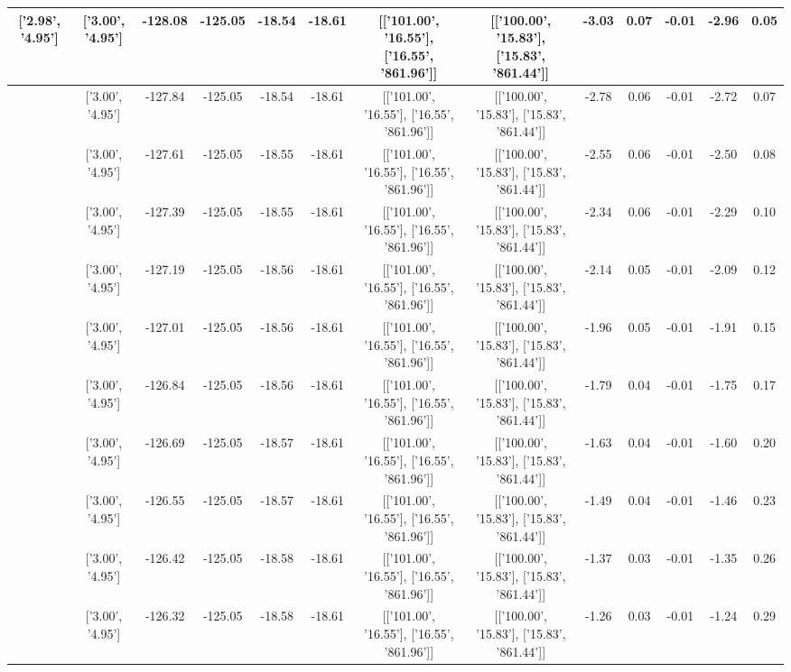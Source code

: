 \begin{table}[htbp]
\begin{adjustbox}{angle=90}
\begin{tabular}{|c|c|c|c|c|c|c|c|c|c|c|c|c|}
 ['2.98', '4.95'] & ['3.00', '4.95'] & -128.08 & -125.05 & -18.54 & -18.61 & [['101.00', '16.55'], ['16.55', '861.96']] & [['100.00', '15.83'], ['15.83', '861.44']] & -3.03 & 0.07 & -0.01 & -2.96 & 0.05\\ \hline
 ['2.98', '4.95'] & ['3.00', '4.95'] & -127.84 & -125.05 & -18.54 & -18.61 & [['101.00', '16.55'], ['16.55', '861.96']] & [['100.00', '15.83'], ['15.83', '861.44']] & -2.78 & 0.06 & -0.01 & -2.72 & 0.07\\ \hline
 ['2.98', '4.95'] & ['3.00', '4.95'] & -127.61 & -125.05 & -18.55 & -18.61 & [['101.00', '16.55'], ['16.55', '861.96']] & [['100.00', '15.83'], ['15.83', '861.44']] & -2.55 & 0.06 & -0.01 & -2.50 & 0.08\\ \hline
 ['2.98', '4.95'] & ['3.00', '4.95'] & -127.39 & -125.05 & -18.55 & -18.61 & [['101.00', '16.55'], ['16.55', '861.96']] & [['100.00', '15.83'], ['15.83', '861.44']] & -2.34 & 0.06 & -0.01 & -2.29 & 0.10\\ \hline
 ['2.98', '4.95'] & ['3.00', '4.95'] & -127.19 & -125.05 & -18.56 & -18.61 & [['101.00', '16.55'], ['16.55', '861.96']] & [['100.00', '15.83'], ['15.83', '861.44']] & -2.14 & 0.05 & -0.01 & -2.09 & 0.12\\ \hline
 ['2.99', '4.95'] & ['3.00', '4.95'] & -127.01 & -125.05 & -18.56 & -18.61 & [['101.00', '16.55'], ['16.55', '861.96']] & [['100.00', '15.83'], ['15.83', '861.44']] & -1.96 & 0.05 & -0.01 & -1.91 & 0.15\\ \hline
 ['2.99', '4.95'] & ['3.00', '4.95'] & -126.84 & -125.05 & -18.56 & -18.61 & [['101.00', '16.55'], ['16.55', '861.96']] & [['100.00', '15.83'], ['15.83', '861.44']] & -1.79 & 0.04 & -0.01 & -1.75 & 0.17\\ \hline
 ['2.99', '4.95'] & ['3.00', '4.95'] & -126.69 & -125.05 & -18.57 & -18.61 & [['101.00', '16.55'], ['16.55', '861.96']] & [['100.00', '15.83'], ['15.83', '861.44']] & -1.63 & 0.04 & -0.01 & -1.60 & 0.20\\ \hline
 ['2.99', '4.95'] & ['3.00', '4.95'] & -126.55 & -125.05 & -18.57 & -18.61 & [['101.00', '16.55'], ['16.55', '861.96']] & [['100.00', '15.83'], ['15.83', '861.44']] & -1.49 & 0.04 & -0.01 & -1.46 & 0.23\\ \hline
 ['2.99', '4.95'] & ['3.00', '4.95'] & -126.42 & -125.05 & -18.58 & -18.61 & [['101.00', '16.55'], ['16.55', '861.96']] & [['100.00', '15.83'], ['15.83', '861.44']] & -1.37 & 0.03 & -0.01 & -1.35 & 0.26\\ \hline
 ['2.99', '4.95'] & ['3.00', '4.95'] & -126.32 & -125.05 & -18.58 & -18.61 & [['101.00', '16.55'], ['16.55', '861.96']] & [['100.00', '15.83'], ['15.83', '861.44']] & -1.26 & 0.03 & -0.01 & -1.24 & 0.29\\ \hline

\end{tabular}
\end{adjustbox}
\end{table}
